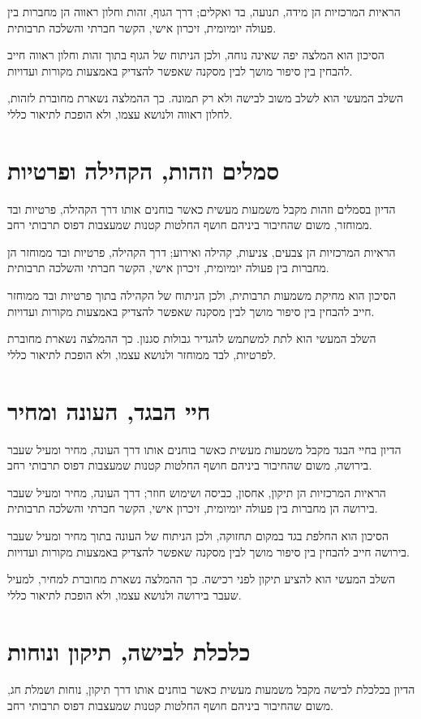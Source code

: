 הראיות המרכזיות הן מידה, תנועה, בד ואקלים; דרך הגוף, זהות וחלון ראווה הן מחברות בין פעולה יומיומית, זיכרון אישי, הקשר חברתי והשלכה תרבותית.

הסיכון הוא המלצה יפה שאינה נוחה, ולכן הניתוח של הגוף בתוך זהות וחלון ראווה חייב להבחין בין סיפור מושך לבין מסקנה שאפשר להצדיק באמצעות מקורות ועדויות.

השלב המעשי הוא לשלב משוב לבישה ולא רק תמונה. כך ההמלצה נשארת מחוברת לזהות, לחלון ראווה ולנושא עצמו, ולא הופכת לתיאור כללי.

\section{סמלים וזהות, הקהילה ופרטיות}
הדיון בסמלים וזהות מקבל משמעות מעשית כאשר בוחנים אותו דרך הקהילה, פרטיות ובד ממוחזר, משום שהחיבור ביניהם חושף החלטות קטנות שמעצבות דפוס תרבותי רחב.

הראיות המרכזיות הן צבעים, צניעות, קהילה ואירוע; דרך הקהילה, פרטיות ובד ממוחזר הן מחברות בין פעולה יומיומית, זיכרון אישי, הקשר חברתי והשלכה תרבותית.

הסיכון הוא מחיקת משמעות תרבותית, ולכן הניתוח של הקהילה בתוך פרטיות ובד ממוחזר חייב להבחין בין סיפור מושך לבין מסקנה שאפשר להצדיק באמצעות מקורות ועדויות.

השלב המעשי הוא לתת למשתמש להגדיר גבולות סגנון. כך ההמלצה נשארת מחוברת לפרטיות, לבד ממוחזר ולנושא עצמו, ולא הופכת לתיאור כללי.

\section{חיי הבגד, העונה ומחיר}
הדיון בחיי הבגד מקבל משמעות מעשית כאשר בוחנים אותו דרך העונה, מחיר ומעיל שעבר בירושה, משום שהחיבור ביניהם חושף החלטות קטנות שמעצבות דפוס תרבותי רחב.

הראיות המרכזיות הן תיקון, אחסון, כביסה ושימוש חוזר; דרך העונה, מחיר ומעיל שעבר בירושה הן מחברות בין פעולה יומיומית, זיכרון אישי, הקשר חברתי והשלכה תרבותית.

הסיכון הוא החלפת בגד במקום תחזוקה, ולכן הניתוח של העונה בתוך מחיר ומעיל שעבר בירושה חייב להבחין בין סיפור מושך לבין מסקנה שאפשר להצדיק באמצעות מקורות ועדויות.

השלב המעשי הוא להציע תיקון לפני רכישה. כך ההמלצה נשארת מחוברת למחיר, למעיל שעבר בירושה ולנושא עצמו, ולא הופכת לתיאור כללי.

\section{כלכלת לבישה, תיקון ונוחות}
הדיון בכלכלת לבישה מקבל משמעות מעשית כאשר בוחנים אותו דרך תיקון, נוחות ושמלת חג, משום שהחיבור ביניהם חושף החלטות קטנות שמעצבות דפוס תרבותי רחב.

